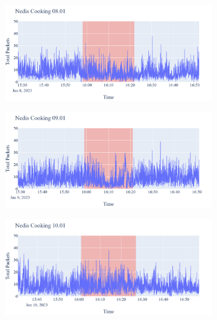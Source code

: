 \begin{figure}[H]
    \begin{subfigure}[b]{0.47\textwidth}
        \centering
        \includegraphics[width=1.2\hsize]{figures/Nedis_Cooking_Packets_08.01.png}
    \end{subfigure}
    \begin{subfigure}[b]{0.47\textwidth}
        \centering
        \includegraphics[width=1.2\hsize]{figures/Nedis_Cooking_Packets_09.01.png}
    \end{subfigure}
    \begin{subfigure}[b]{0.47\textwidth}
        \centering
        \includegraphics[width=1.2\hsize]{figures/Nedis_Cooking_Packets_10.01.png}
    \end{subfigure}
    \begin{subfigure}[b]{0.47\textwidth}

\end{subfigure}
\end{figure}
